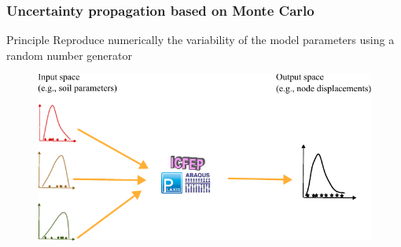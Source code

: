  \begin{frame}
 \frametitle{Uncertainty propagation based on Monte Carlo}
 \begin{block}{Principle}
    Reproduce numerically the variability of the model parameters using a random number generator 
 \end{block}

\begin{figure}
    \includegraphics[scale=0.9]{figures/figure-UQ_propagation_MC.pdf}
\end{figure}


 \end{frame}
